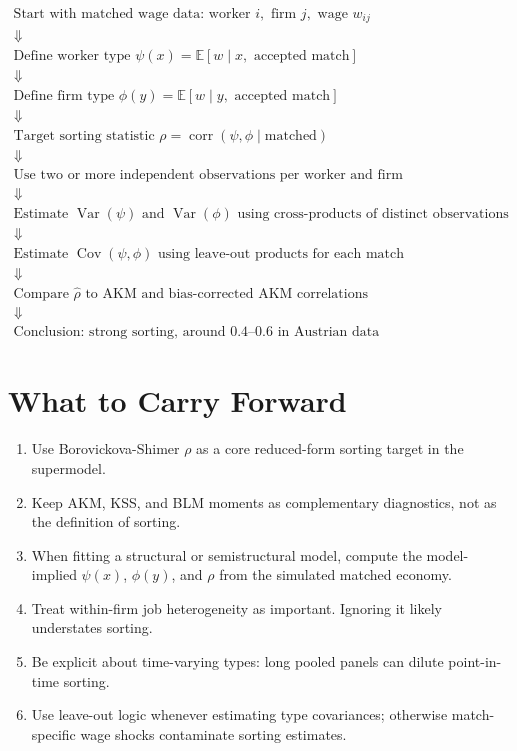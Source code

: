 \documentclass[11pt]{article}
\newcommand{\E}{\mathbb{E}}
\newcommand{\Var}{\operatorname{Var}}
\newcommand{\Cov}{\operatorname{Cov}}
\newcommand{\corr}{\operatorname{corr}}
\begin{document}
\[
\begin{array}{c}
\text{Start with matched wage data: worker }i,\text{ firm }j,\text{ wage }w_{ij} \\
\Downarrow \\
\text{Define worker type } \psi(x)=\E[w\mid x,\text{ accepted match}] \\
\Downarrow \\
\text{Define firm type } \phi(y)=\E[w\mid y,\text{ accepted match}] \\
\Downarrow \\
\text{Target sorting statistic } \rho=\corr(\psi,\phi\mid \text{matched}) \\
\Downarrow \\
\text{Use two or more independent observations per worker and firm} \\
\Downarrow \\
\text{Estimate } \Var(\psi)\text{ and }\Var(\phi)\text{ using cross-products of distinct observations} \\
\Downarrow \\
\text{Estimate } \Cov(\psi,\phi)\text{ using leave-out products for each match} \\
\Downarrow \\
\text{Compare } \widehat\rho\text{ to AKM and bias-corrected AKM correlations} \\
\Downarrow \\
\text{Conclusion: strong sorting, around }0.4\text{--}0.6\text{ in Austrian data}
\end{array}
\]

\section{What to Carry Forward}

\begin{enumerate}[leftmargin=*]
  \item Use Borovickova-Shimer $\rho$ as a core reduced-form sorting target in the supermodel.
  \item Keep AKM, KSS, and BLM moments as complementary diagnostics, not as the definition of sorting.
  \item When fitting a structural or semistructural model, compute the model-implied $\psi(x)$, $\phi(y)$, and $\rho$ from the simulated matched economy.
  \item Treat within-firm job heterogeneity as important. Ignoring it likely understates sorting.
  \item Be explicit about time-varying types: long pooled panels can dilute point-in-time sorting.
  \item Use leave-out logic whenever estimating type covariances; otherwise match-specific wage shocks contaminate sorting estimates.
\end{enumerate}
\end{document}

